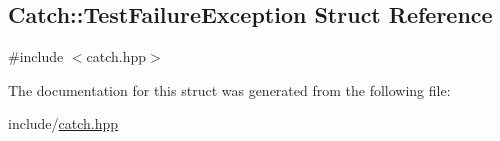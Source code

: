 \hypertarget{structCatch_1_1TestFailureException}{\subsection{Catch\-:\-:Test\-Failure\-Exception Struct Reference}
\label{structCatch_1_1TestFailureException}
}


{\ttfamily \#include $<$catch.\-hpp$>$}



The documentation for this struct was generated from the following file\-:\begin{DoxyCompactItemize}
\item 
include/\hyperlink{catch_8hpp}{catch.\-hpp}\end{DoxyCompactItemize}
